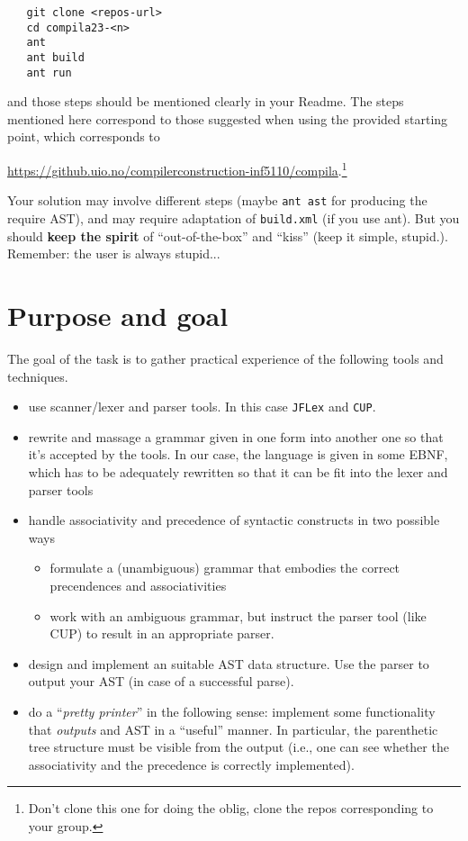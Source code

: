 \documentclass[10pt,freeform]{handout}[2014/08/13]
\begin{document}
\begin{verbatim}
   git clone <repos-url>
   cd compila23-<n>
   ant
   ant build
   ant run
\end{verbatim}
and those steps should be mentioned clearly in your Readme. The steps
mentioned here correspond to those suggested when using the provided
starting point, which corresponds to
\begin{center}
  \url{https://github.uio.no/compilerconstruction-inf5110/compila}.\footnote{Don't
    clone this one for doing the oblig, clone the repos corresponding to
    your group.}
\end{center}
Your solution may involve different steps (maybe \texttt{ant ast} for
producing the require AST), and may require adaptation of \texttt{build.xml}
(if you use ant). But you should \textbf{keep the spirit} of
``out-of-the-box'' and ``kiss'' (keep it simple, stupid.). Remember: the
user is always stupid...





\section{Purpose and goal}
\label{sec:x}

The goal of the task is to gather practical experience of the following
tools and techniques.
\begin{itemize}
\item use scanner/lexer and parser tools. In this case \texttt{JFLex} and
  \texttt{CUP}.
\item rewrite and massage a grammar given in one form into another one so
  that it's accepted by the tools. In our case, the language is given in
  some EBNF, which has to be adequately rewritten so that it can be fit
  into the lexer and parser tools
\item handle associativity and precedence of syntactic constructs in two
  possible ways
  \begin{itemize}
  \item formulate a (unambiguous) grammar that embodies the correct
    precendences and associativities
  \item work with an ambiguous grammar, but instruct the parser tool (like
    CUP) to result in an appropriate parser.
  \end{itemize}
\item design and implement an suitable AST data structure.  Use the parser
  to output your AST (in case of a successful parse).
\item do a ``\emph{pretty printer}'' in the following sense: implement some
  functionality that \emph{outputs} and AST in a ``useful'' manner. In
  particular, the parenthetic tree structure must be visible from the
  output (i.e., one can see whether the associativity and the precedence is
  correctly implemented). 
\end{itemize}
\end{document}
